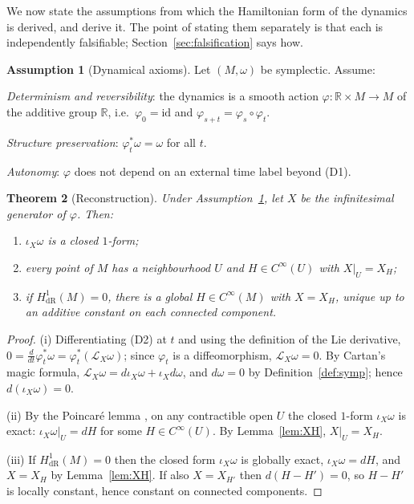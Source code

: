\documentclass[10pt,a4paper]{article}
\theoremstyle{plain}
\newtheorem{theorem}{Theorem}
\theoremstyle{definition}
\newtheorem{assumption}[theorem]{Assumption}
\newcommand{\Cinf}{C^{\infty}}
\newcommand{\dR}{\mathrm{dR}}
\newcommand{\Lie}{\mathcal{L}}
\newcommand{\ins}{\iota}
\newcommand{\R}{\mathbb{R}}
\begin{document}
We now state the assumptions from which the Hamiltonian form of the dynamics is derived, and derive it. The point of stating them separately is that each is independently falsifiable; Section~\ref{sec:falsification} says how.

\begin{assumption}[Dynamical axioms]
\label{ass:dyn}
Let $(M,\omega)$ be symplectic. Assume:
\begin{description}[leftmargin=2.2em,itemsep=0pt]
\item[(D1)] \emph{Determinism and reversibility}: the dynamics is a smooth action $\varphi: \R\times M \to M$ of the additive group $\R$, i.e.\ $\varphi_0 = \mathrm{id}$ and $\varphi_{s+t} = \varphi_s\circ\varphi_t$.
\item[(D2)] \emph{Structure preservation}: $\varphi_t^*\omega = \omega$ for all $t$.
\item[(D3)] \emph{Autonomy}: $\varphi$ does not depend on an external time label beyond (D1).
\end{description}
\end{assumption}

\begin{theorem}[Reconstruction]
\label{thm:reconstruction}
Under Assumption~\ref{ass:dyn}, let $X$ be the infinitesimal generator of $\varphi$. Then:
\begin{enumerate}[label=(\roman*),leftmargin=2em,itemsep=0pt]
\item $\ins_X\omega$ is a closed $1$-form;
\item every point of $M$ has a neighbourhood $U$ and $H \in \Cinf(U)$ with $X|_U = X_H$;
\item if $H^1_{\dR}(M) = 0$, there is a global $H \in \Cinf(M)$ with $X = X_H$, unique up to an additive constant on each connected component.
\end{enumerate}
\end{theorem}
\begin{proof}
(i) Differentiating (D2) at $t$ and using the definition of the Lie derivative, $0 = \frac{d}{dt}\varphi_t^*\omega = \varphi_t^*(\Lie_X\omega)$; since $\varphi_t$ is a diffeomorphism, $\Lie_X\omega = 0$. By Cartan's magic formula, $\Lie_X\omega = d\ins_X\omega + \ins_X d\omega$, and $d\omega = 0$ by Definition~\ref{def:symp}; hence $d(\ins_X\omega) = 0$.

(ii) By the Poincar\'e lemma \cite[Ch.~17]{Lee2013}, on any contractible open $U$ the closed $1$-form $\ins_X\omega$ is exact: $\ins_X\omega|_U = dH$ for some $H \in \Cinf(U)$. By Lemma~\ref{lem:XH}, $X|_U = X_H$.

(iii) If $H^1_{\dR}(M) = 0$ then the closed form $\ins_X\omega$ is globally exact, $\ins_X\omega = dH$, and $X = X_H$ by Lemma~\ref{lem:XH}. If also $X = X_{H'}$ then $d(H - H') = 0$, so $H - H'$ is locally constant, hence constant on connected components.
\end{proof}
\end{document}
